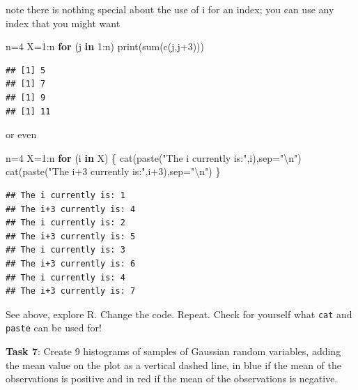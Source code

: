 \documentclass[
]{article}
\newenvironment{Shaded}{\begin{snugshade}}{\end{snugshade}}
\newcommand{\AttributeTok}[1]{\textcolor[rgb]{0.77,0.63,0.00}{#1}}
\newcommand{\ControlFlowTok}[1]{\textcolor[rgb]{0.13,0.29,0.53}{\textbf{#1}}}
\newcommand{\DecValTok}[1]{\textcolor[rgb]{0.00,0.00,0.81}{#1}}
\newcommand{\FunctionTok}[1]{\textcolor[rgb]{0.00,0.00,0.00}{#1}}
\newcommand{\NormalTok}[1]{#1}
\newcommand{\OtherTok}[1]{\textcolor[rgb]{0.56,0.35,0.01}{#1}}
\newcommand{\SpecialCharTok}[1]{\textcolor[rgb]{0.00,0.00,0.00}{#1}}
\newcommand{\StringTok}[1]{\textcolor[rgb]{0.31,0.60,0.02}{#1}}
\begin{document}
note there is nothing special about the use of i for an index; you can
use any index that you might want

\begin{Shaded}
\begin{Highlighting}[]
\NormalTok{n}\OtherTok{=}\DecValTok{4}
\NormalTok{X}\OtherTok{=}\DecValTok{1}\SpecialCharTok{:}\NormalTok{n}
\ControlFlowTok{for}\NormalTok{ (j }\ControlFlowTok{in} \DecValTok{1}\SpecialCharTok{:}\NormalTok{n) }\FunctionTok{print}\NormalTok{(}\FunctionTok{sum}\NormalTok{(}\FunctionTok{c}\NormalTok{(j,j}\SpecialCharTok{+}\DecValTok{3}\NormalTok{)))}
\end{Highlighting}
\end{Shaded}

\begin{verbatim}
## [1] 5
## [1] 7
## [1] 9
## [1] 11
\end{verbatim}

or even

\begin{Shaded}
\begin{Highlighting}[]
\NormalTok{n}\OtherTok{=}\DecValTok{4}
\NormalTok{X}\OtherTok{=}\DecValTok{1}\SpecialCharTok{:}\NormalTok{n}
\ControlFlowTok{for}\NormalTok{ (i }\ControlFlowTok{in}\NormalTok{ X) \{}
  \FunctionTok{cat}\NormalTok{(}\FunctionTok{paste}\NormalTok{(}\StringTok{"The i currently is:"}\NormalTok{,i),}\AttributeTok{sep=}\StringTok{"}\SpecialCharTok{\textbackslash{}n}\StringTok{"}\NormalTok{)}
  \FunctionTok{cat}\NormalTok{(}\FunctionTok{paste}\NormalTok{(}\StringTok{"The i+3 currently is:"}\NormalTok{,i}\SpecialCharTok{+}\DecValTok{3}\NormalTok{),}\AttributeTok{sep=}\StringTok{"}\SpecialCharTok{\textbackslash{}n}\StringTok{"}\NormalTok{)}
\NormalTok{  \}}
\end{Highlighting}
\end{Shaded}

\begin{verbatim}
## The i currently is: 1
## The i+3 currently is: 4
## The i currently is: 2
## The i+3 currently is: 5
## The i currently is: 3
## The i+3 currently is: 6
## The i currently is: 4
## The i+3 currently is: 7
\end{verbatim}

See above, explore R. Change the code. Repeat. Check for yourself what
\texttt{cat} and \texttt{paste} can be used for!

\textbf{Task 7}: Create 9 histograms of samples of Gaussian random
variables, adding the mean value on the plot as a vertical dashed line,
in blue if the mean of the observations is positive and in red if the
mean of the observations is negative.
\end{document}
